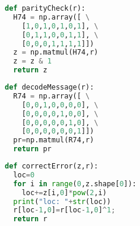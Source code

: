 \documentclass[12pt]{article}
\begin{document}
\begin{lstlisting}[frame=single,language=Python,caption=encode74 \label{code:something something}]
def parityCheck(r): 
  H74 = np.array([ \
    [1,0,1,0,1,0,1], \
    [0,1,1,0,0,1,1], \
    [0,0,0,1,1,1,1]])
  z = np.matmul(H74,r)
  z = z & 1
  return z
\end{lstlisting}

\begin{lstlisting}[frame=single,language=Python,caption=encode74 \label{code:something something}]
def decodeMessage(r): 
  R74 = np.array([ \
    [0,0,1,0,0,0,0], \
    [0,0,0,0,1,0,0], \
    [0,0,0,0,0,1,0], \
    [0,0,0,0,0,0,1]])
  pr=np.matmul(R74,r)
  return pr
\end{lstlisting}

\begin{lstlisting}[frame=single,language=Python,caption=encode74 \label{code:something something}]
def correctError(z,r): 
  loc=0
  for i in range(0,z.shape[0]):
    loc+=z[i,0]*pow(2,i)
  print("loc: "+str(loc))
  r[loc-1,0]=r[loc-1,0]^1;
  return r
\end{lstlisting}
\end{document}
